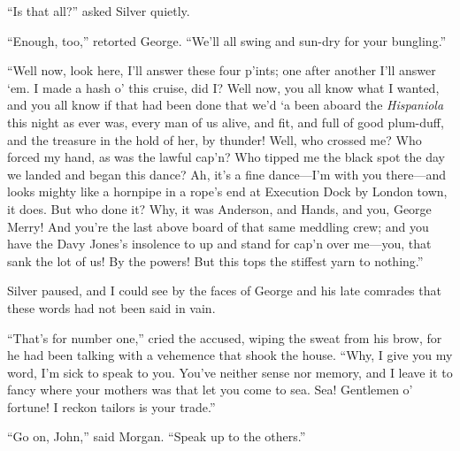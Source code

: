 \enquote{Is that all?} asked Silver quietly.

\enquote{Enough, too,} retorted George. \enquote{We’ll all swing and sun-dry for your bungling.}

\enquote{Well now, look here, I’ll answer these four p’ints; one after another I’ll answer `em. I made a hash o’ this cruise, did I? Well now, you all know what I wanted, and you all know if that had been done that we’d `a been aboard the \textit{Hispaniola} this night as ever was, every man of us alive, and fit, and full of good plum-duff, and the treasure in the hold of her, by thunder! Well, who crossed me? Who forced my hand, as was the lawful cap’n? Who tipped me the black spot the day we landed and began this dance? Ah, it’s a fine dance---I’m with you there---and looks mighty like a hornpipe in a rope’s end at Execution Dock by London town, it does. But who done it? Why, it was Anderson, and Hands, and you, George Merry! And you’re the last above board of that same meddling crew; and you have the Davy Jones’s insolence to up and stand for cap’n over me---you, that sank the lot of us! By the powers! But this tops the stiffest yarn to nothing.}

Silver paused, and I could see by the faces of George and his late comrades that these words had not been said in vain.

\enquote{That’s for number one,} cried the accused, wiping the sweat from his brow, for he had been talking with a vehemence that shook the house. \enquote{Why, I give you my word, I’m sick to speak to you. You’ve neither sense nor memory, and I leave it to fancy where your mothers was that let you come to sea. Sea! Gentlemen o’ fortune! I reckon tailors is your trade.}

\enquote{Go on, John,} said Morgan. \enquote{Speak up to the others.}

